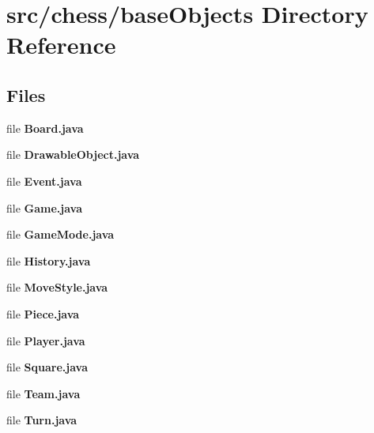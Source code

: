 \section{src/chess/base\+Objects Directory Reference}
\label{dir_8e1b12baee6cd7c14a203297514d7d24}
\subsection*{Files}
\begin{DoxyCompactItemize}
\item 
file {\bf Board.\+java}
\item 
file {\bf Drawable\+Object.\+java}
\item 
file {\bf Event.\+java}
\item 
file {\bf Game.\+java}
\item 
file {\bf Game\+Mode.\+java}
\item 
file {\bf History.\+java}
\item 
file {\bf Move\+Style.\+java}
\item 
file {\bf Piece.\+java}
\item 
file {\bf Player.\+java}
\item 
file {\bf Square.\+java}
\item 
file {\bf Team.\+java}
\item 
file {\bf Turn.\+java}
\end{DoxyCompactItemize}
